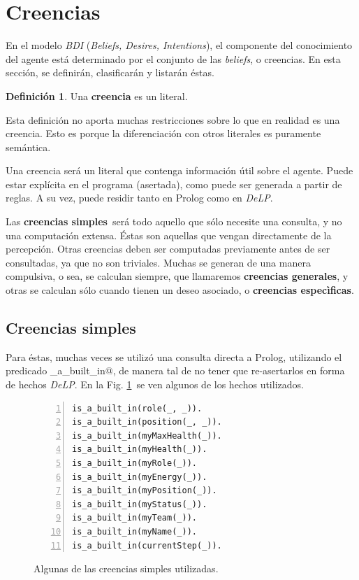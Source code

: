 \documentclass[oneside]{book}
\theoremstyle{definition}
\newtheorem{definicion}{Definición}[section]
\newcommand{\DLP}{\mbox{\textit{DeLP}}}
\begin{document}
\section{Creencias}

\label{sec:creencias}

En el modelo \textit{BDI} (\textit{Beliefs, Desires, Intentions}), el componente del conocimiento
del agente está determinado por el conjunto de las \textit{beliefs}, o creencias. En esta
sección, se definirán, clasificarán y listarán éstas.

\begin{definicion}
	Una \textbf{creencia} es un literal.
\end{definicion}

Esta definición no aporta muchas restricciones sobre lo que en realidad es una creencia.
Esto es porque la diferenciación con otros literales es puramente semántica.

Una creencia será un literal que contenga información útil sobre el agente. Puede estar
explícita en el programa (asertada), como puede ser generada a partir de reglas. A su vez,
puede residir tanto en Prolog como en \DLP.

Las \textbf{creencias simples}\ será todo aquello que sólo necesite una consulta, y no
una computación extensa. Éstas son aquellas que vengan directamente de la percepción. 
Otras creencias deben ser computadas previamente antes de ser consultadas, ya que no
son triviales. Muchas se generan de una manera compulsiva, o sea, se calculan siempre,
que llamaremos \textbf{creencias generales},
y otras se calculan sólo cuando tienen un deseo asociado, o \textbf{creencias 
especìficas}.


\subsection{Creencias simples}


Para éstas, muchas veces se utilizó una consulta directa a Prolog,
utilizando el predicado \verb@is_a_built_in@, de manera tal de no tener que 
re-asertarlos en forma de hechos \DLP. En la Fig. \ref{fig:creenciasSimples}\ se ven
algunos de los hechos utilizados.

\begin{figure}
\centering
\begin{Verbatim}[numbers=left]
is_a_built_in(role(_, _)).
is_a_built_in(position(_, _)).
is_a_built_in(myMaxHealth(_)).
is_a_built_in(myHealth(_)).
is_a_built_in(myRole(_)).
is_a_built_in(myEnergy(_)).
is_a_built_in(myPosition(_)).
is_a_built_in(myStatus(_)).
is_a_built_in(myTeam(_)).
is_a_built_in(myName(_)).
is_a_built_in(currentStep(_)).
\end{Verbatim}
\caption{Algunas de las creencias simples utilizadas.}
\label{fig:creenciasSimples}
\end{figure}
\end{document}
